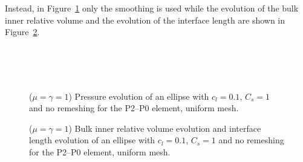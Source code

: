 \documentclass[a4paper,12pt,onecolumn]{article}
\begin{document}
Instead, in Figure~\ref{fig:ellipse_smooth} only the smoothing is used while the evolution of the bulk inner relative volume and the evolution of the interface length are shown in Figure~\ref{fig:ellipse_smooth_volumes}.
\begin{figure}[htbp]
  \centering
  \\
  \quad
  \\
  \quad
  \\
  \caption{($\mu=\gamma=1$) Pressure evolution of an ellipse with $c_l=0.1$, $C_s=1$ and no remeshing for the P2--P0 element, uniform mesh.}
  \label{fig:ellipse_smooth}
\end{figure}

\begin{figure}[htbp]
  \centering
  \caption{($\mu=\gamma=1$) Bulk inner relative volume evolution and interface length evolution of an ellipse with $c_l=0.1$, $C_s=1$ and no remeshing for the P2--P0 element, uniform mesh.}
  \label{fig:ellipse_smooth_volumes}
\end{figure}
\end{document}
